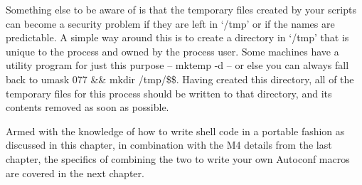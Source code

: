 Something else to be aware of is that the temporary files created by your scripts can become a security problem if they are left in `/tmp' or if the names are predictable. A simple way around this is to create a directory in `/tmp' that is unique to the process and owned by the process user. Some machines have a utility program for just this purpose -- mktemp -d -- or else you can always fall back to umask 077 \&\& mkdir /tmp/\$\$. Having created this directory, all of the temporary files for this process should be written to that directory, and its contents removed as soon as possible.

Armed with the knowledge of how to write shell code in a portable fashion as discussed in this chapter, in combination with the M4 details from the last chapter, the specifics of combining the two to write your own Autoconf macros are covered in the next chapter. 

